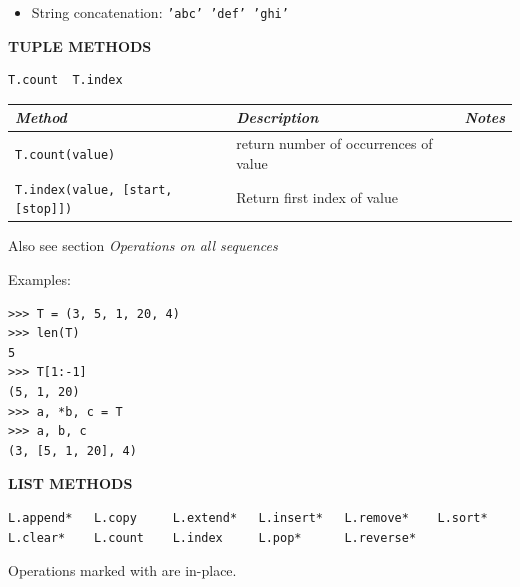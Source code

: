 \documentclass[9pt,a4wide]{extarticle}
\begin{document}
\medskip

\begin{itemize}
\item String concatenation: {\tt 'abc' 'def' 'ghi'}
\end{itemize}




\bigskip
{\LARGE\bf TUPLE METHODS}
{}

\begin{verbatim}
T.count  T.index 
\end{verbatim}

\begin{supertabular}{|l|p{9cm}|c|}\hline
{\em Method}  & {\em Description}     &  {\em Notes}       \\ \hline\hline

{\tt T.count(value)}  &  return number of occurrences of value          &                \\ \hline

{\tt T.index(value, [start, [stop]])}  &  Return first index of value   &    \\ \hline

\end{supertabular}

\bigskip

Also see section {\em Operations on all sequences}

\medskip

Examples:

\begin{verbatim}
>>> T = (3, 5, 1, 20, 4)
>>> len(T)
5
>>> T[1:-1]
(5, 1, 20)
>>> a, *b, c = T
>>> a, b, c
(3, [5, 1, 20], 4)
\end{verbatim}



\bigskip
{\LARGE\bf LIST METHODS}
{}


\begin{verbatim}
L.append*   L.copy     L.extend*   L.insert*   L.remove*    L.sort*    
L.clear*    L.count    L.index     L.pop*      L.reverse* 
\end{verbatim}

Operations marked with {\tt *} are in-place.

\bigskip
\end{document}
